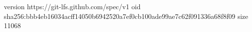 version https://git-lfs.github.com/spec/v1
oid sha256:bbb4eb16034acff14050b6942520a7ef0cb100ade99ae7c62f091336a68f8f09
size 11068
